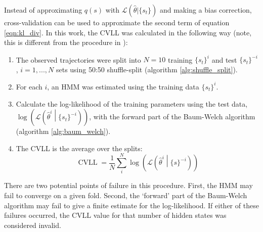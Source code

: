 Instead of approximating $q(s)$ with $\mathcal{L}\left(\hat{\theta}|\{s_t\}\right)$ and making a bias correction, cross-validation can be used to approximate the second term of equation \ref{eqn:kl_div}.\cite{celeuxSelectingHiddenMarkov2008} In this work, the CVLL was calculated in the following way (note, this is different from the procedure in \cite{celeuxSelectingHiddenMarkov2008}): 
\begin{enumerate}
    \item The observed trajectories were split into $N = 10$ training $\{s_t\}^{i}$ and test $\{s_t\}^{-i}$, $i = 1, ..., N$ sets using 50:50 shuffle-split (algorithm \ref{alg:shuffle_split}). 
    \item For each $i$, an HMM was estimated using the training data $\{s_t\}^{i}$. 
    \item Calculate the log-likelihood of the training parameters using the test data,  $\log{\left(\mathcal{L}\left(\hat{\theta}^{i}\middle|\{s_t\}^{-i}\right)\right)}$, with the forward part of the Baum-Welch algorithm (algorithm \ref{alg:baum_welch}). 
    \item The CVLL is the average over the splits: 
    \begin{equation}
        \operatorname{CVLL} = \frac{1}{N}\sum_{i}^{N}\log{\left(\mathcal{L}\left(\hat{\theta}^{i} \middle | \{s\}^{-i}\right)\right)}
    \end{equation}
\end{enumerate}
There are two potential points of failure in this procedure. First, the HMM may fail to converge on a given fold. Second, the `forward' part of the Baum-Welch algorithm may fail to give a finite estimate for the log-likelihood. If either of these failures occurred, the CVLL value for that number of hidden states was considered invalid. 

